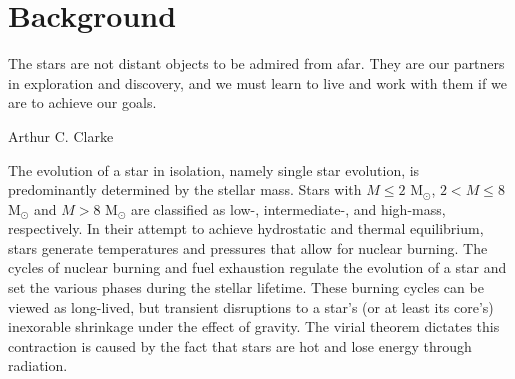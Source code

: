 \chapter{Background}\label{background}

\epigraph{The stars are not distant objects to be admired from afar. They are our partners in exploration and discovery, and we must learn to live and work with them if we are to achieve our goals.}{Arthur C. Clarke}

The evolution of a star in isolation, namely single star evolution, is predominantly determined by the stellar mass. Stars with $M \leq 2$ M$_{\odot}$, $2 < M \leq 8$ M$_{\odot}$ and $M > 8$ M$_{\odot}$ are classified as low-, intermediate-, and high-mass, respectively. In their attempt to achieve hydrostatic and thermal equilibrium, stars generate temperatures and pressures that allow for nuclear burning. The cycles of nuclear burning and fuel exhaustion regulate the evolution of a star and set the various phases during the stellar lifetime. These burning cycles can be viewed as long-lived, but transient disruptions to a star's (or at least its core's) inexorable shrinkage under the effect of gravity. The virial theorem dictates this contraction is caused by the fact that stars are hot and lose energy through radiation. 










